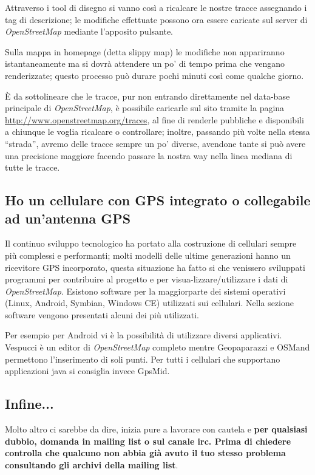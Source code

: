 \documentclass[a4paper,twoside,12pt,]{article}
\newcommand{\osm}{\emph{OpenStreetMap}\xspace}
\newcommand{\gps}{GPS\xspace}
\begin{document}
Attraverso i tool di disegno si vanno così a ricalcare le nostre tracce assegnando i tag di descrizione; le modifiche effettuate possono ora essere caricate sul server di \osm mediante l'apposito pulsante.

Sulla mappa in homepage (detta slippy map) le modifiche non appariranno istantaneamente ma si dovrà attendere un po' di tempo prima che vengano renderizzate; questo processo può durare pochi minuti così come qualche giorno.

È da sottolineare che le tracce, pur non entrando direttamente nel data-base principale di \osm, è possibile caricarle sul sito tramite la pagina \url{http://www.openstreetmap.org/traces}, al fine di renderle pubbliche e disponibili a chiunque le voglia ricalcare o controllare; inoltre, passando più volte nella stessa ``strada'', avremo delle tracce sempre un po' diverse, avendone tante si può avere una precisione maggiore facendo passare la nostra way nella linea mediana di tutte le tracce.
\subsection{Ho un cellulare con \gps integrato o collegabile ad un'antenna \gps}
Il continuo sviluppo tecnologico ha portato alla costruzione di cellulari sempre più complessi e performanti; molti modelli delle ultime generazioni hanno un ricevitore \gps incorporato, questa situazione ha fatto si che venissero sviluppati programmi per contribuire al progetto e per visua-lizzare/utilizzare i dati di \osm. Esistono software per la maggiorparte dei sistemi operativi (Linux, Android, Symbian, Windows CE) utilizzati sui cellulari. Nella sezione software vengono presentati alcuni dei più utilizzati.

Per esempio per Android vi è la possibilità di utilizzare diversi applicativi. Vespucci è un editor di \osm completo mentre Geopaparazzi e OSMand permettono l'inserimento di soli punti. Per tutti i cellulari che supportano applicazioni java si consiglia invece GpsMid.


\subsection{Infine...}
Molto altro ci sarebbe da dire, inizia pure a lavorare con cautela e \textbf{per qualsiasi dubbio, domanda in mailing list o sul canale irc. Prima di chiedere controlla che qualcuno non abbia già avuto il tuo stesso problema consultando gli archivi della mailing list}.
\end{document}
